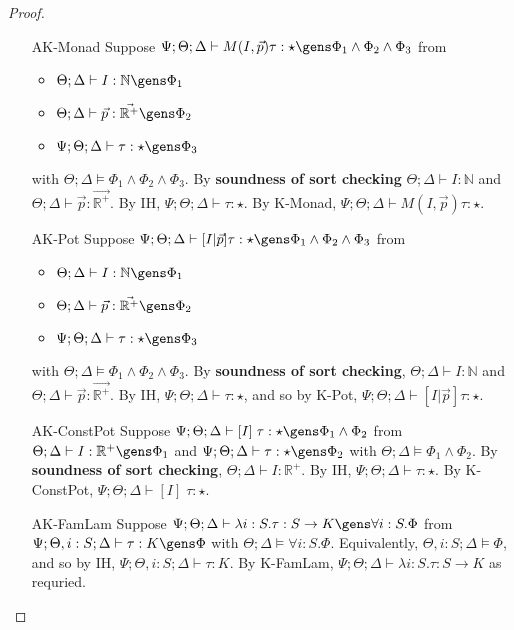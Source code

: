 \begin{proof}
\begin{itemize}
  \item[AK-Monad] Suppose $\Psi ; \Theta ; \Delta \vdash M(I,\vec{p}) \tau : \star \gens \Phi_1 \wedge \Phi_2 \wedge \Phi_3$ from
  \begin{itemize}
    \item $\Theta ; \Delta \vdash I : \mathbb{N} \gens \Phi_1$
    \item $\Theta ; \Delta \vdash \vec{p} : \vec{\mathbb{R}^+} \gens \Phi_2$
    \item $\Psi ; \Theta ; \Delta \vdash \tau : \star \gens \Phi_3$
  \end{itemize}
  with $\Theta ; \Delta \vDash \Phi_1 \wedge \Phi_2 \wedge \Phi_3$.
  By \textbf{soundness of sort checking} $\Theta ; \Delta \vdash I : \mathbb{N}$ and $\Theta ; \Delta \vdash \vec{p} : \vec{\mathbb{R}^+}$. By IH, $\Psi ; \Theta ; \Delta \vdash \tau : \star$. By K-Monad, $\Psi ; \Theta ; \Delta \vdash M(I,\vec{p}) \tau : \star$.
  \item[AK-Pot] Suppose $\Psi ; \Theta ; \Delta \vdash [I|\vec{p}] \tau : \star \gens \Phi_1 \wedge \Phi_2 \wedge \Phi_3$
  from \begin{itemize}
    \item $\Theta ; \Delta \vdash I : \mathbb{N} \gens \Phi_1$ 
    \item $\Theta ; \Delta \vdash \vec{p} : \vec{\mathbb{R}^+} \gens \Phi_2$
    \item $\Psi ; \Theta ; \Delta \vdash \tau : \star \gens \Phi_3$
  \end{itemize}
  with $\Theta ; \Delta \vDash \Phi_1 \wedge \Phi_2 \wedge \Phi_3$. By \textbf{soundness of sort checking}, $\Theta ; \Delta \vdash I : \mathbb{N}$ and $\Theta ; \Delta \vdash \vec{p} : \vec{\mathbb{R}^+}$. By IH, $\Psi ; \Theta ; \Delta \vdash \tau : \star$, and so by K-Pot, $\Psi ; \Theta ; \Delta \vdash [I|\vec{p}] \tau : \star$.
  \item[AK-ConstPot] Suppose $\Psi ; \Theta ; \Delta \vdash [I] \; \tau : \star \gens \Phi_1 \wedge \Phi_2$ from $\Theta ; \Delta \vdash I : \mathbb{R}^+ \gens \Phi_1$ and $\Psi ; \Theta ; \Delta \vdash \tau : \star \gens \Phi_2$ with $\Theta ; \Delta \vDash \Phi_1 \wedge \Phi_2$. By \textbf{soundness of sort checking}, $\Theta ; \Delta \vdash I : \mathbb{R}^+$. By IH, $\Psi ; \Theta ; \Delta \vdash \tau : \star $. By K-ConstPot, $\Psi ; \Theta ; \Delta \vdash [I] \; \tau : \star$.
  \item[AK-FamLam] Suppose $\Psi ; \Theta ; \Delta \vdash \lambda i : S. \tau : S \to K \gens \forall i : S. \Phi$ from $\Psi ; \Theta, i : S ; \Delta \vdash \tau : K \gens \Phi$ with $\Theta ; \Delta \vDash \forall i : S. \Phi$. Equivalently, $\Theta, i :S ; \Delta \vDash \Phi$, and so by IH, $\Psi ; \Theta, i : S ; \Delta \vdash \tau : K$. By K-FamLam, $\Psi ; \Theta ; \Delta \vdash \lambda i : S. \tau : S \to K$ as requried.

\end{itemize}
\end{proof}
